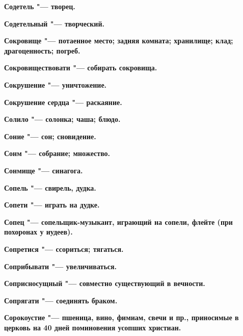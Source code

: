 \begin{multicols}{2}
\bfseries Содетель\normalfont{} "--- творец. 




\bfseries Содетельный\normalfont{} "--- творческий. 




\bfseries Сокровище\normalfont{} "--- потаенное место; задняя комната; хранилище; клад; драгоценность; погреб. 




\bfseries Сокровиществовати\normalfont{} "--- собирать сокровища. 




\bfseries Сокрушение\normalfont{} "--- уничтожение. 




\bfseries Сокрушение сердца\normalfont{} "--- раскаяние. 




\bfseries Солило\normalfont{} "--- солонка; чаша; блюдо. 




\bfseries Соние\normalfont{} "--- сон; сновидение. 




\bfseries Сонм\normalfont{} "--- собрание; множество. 




\bfseries Сонмище\normalfont{} "--- синагога. 




\bfseries Сопель\normalfont{} "--- свирель, дудка. 




\bfseries Сопети\normalfont{} "--- играть на дудке. 




\bfseries Сопец\normalfont{} "--- сопельщик-музыкант, играющий на сопели, флейте (при похоронах у иудеев). 




\bfseries Сопретися\normalfont{} "--- ссориться; тягаться. 




\bfseries Соприбывати\normalfont{} "--- увеличиваться. 




\bfseries Соприсносущный\normalfont{} "--- совместно существующий в вечности. 




\bfseries Сопрягати\normalfont{} "--- соединять браком. 




\bfseries Сорокоустие\normalfont{} "--- пшеница, вино, фимиам, свечи и пр., приносимые в церковь на 40 дней поминовения усопших христиан. 





\end{multicols}
